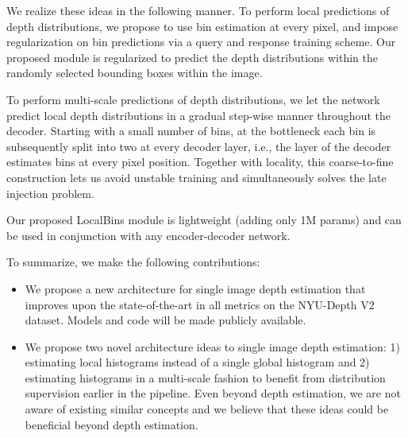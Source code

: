 \documentclass[runningheads]{llncs}
\begin{document}
 
We realize these ideas in the following manner. To perform local predictions of depth distributions, we propose to use bin estimation at every pixel, and impose regularization on bin predictions via a query and response training scheme.
Our proposed module is regularized to predict the depth distributions within the randomly selected bounding boxes within the image.

To perform multi-scale predictions of depth distributions, we let the network predict local depth distributions in a gradual step-wise manner throughout the decoder. Starting with a small  number of bins, at the bottleneck each bin is subsequently split into two at every decoder layer, i.e., the  layer of the decoder estimates  bins at every pixel position. Together with locality, this coarse-to-fine construction lets us avoid unstable training and simultaneously solves the late injection problem. 

Our proposed LocalBins module is lightweight (adding only 1M params) and can be used in conjunction with any encoder-decoder network.

To summarize, we make the following contributions:
\begin{itemize}
    \item We propose a new architecture for single image depth estimation that improves upon the state-of-the-art in all metrics on the NYU-Depth V2~\cite{Silberman2012} dataset. Models and code will be made publicly available.
    \item We propose two novel architecture ideas to single image depth estimation: 1) estimating local histograms instead of a single global histogram and 2) estimating histograms in a multi-scale fashion to benefit from distribution supervision earlier in the pipeline. Even beyond depth estimation, we are not aware of existing similar concepts and we believe that these ideas could be beneficial beyond depth estimation.
\end{itemize}
\end{document}

